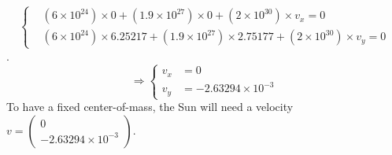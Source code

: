 \documentclass[a4paper, twoside, 11pt]{report}
\theoremstyle{theorem}
\theoremstyle{remark}
\theoremstyle{exemple}
\begin{document}
                \begin{equation*}
                    \left\{
                        \begin{aligned}
                            &(6\times 10^{24}) \times 0 + (1.9 \times 10^{27}) \times 0 + (2 \times 10^{30}) \times v_x = 0 \\
                            &(6\times 10^{24}) \times 6.25217 + (1.9 \times 10^{27}) \times 2.75177 + (2 \times 10^{30}) \times v_y = 0
                        \end{aligned}
                    \right.
                \end{equation*}.
                \begin{equation*}
                   \Longrightarrow \left\{
                        \begin{aligned}
                            v_x &= 0\\
                            v_y &= - 2.63294 \times 10^{-3}
                        \end{aligned}
                    \right.
                    \tag{6}
                \end{equation*}
            To have a fixed center-of-mass, the Sun will need a velocity $v =
            \left(\begin{array}{c}
                0\\
               - 2.63294 \times 10^{-3}
            \end{array} \right)$. 
\end{document}
